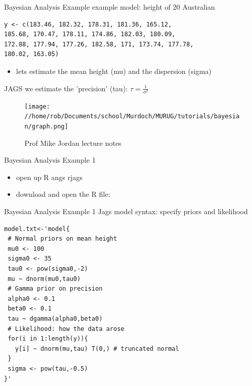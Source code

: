 \documentclass[presentation]{beamer}
\begin{document}
\begin{frame}[fragile,label=sec-26]{Bayesian Analysis Example}
 example model: height of 20 Australian

\color{blue}
\begin{verbatim}
y <- c(183.46, 182.32, 178.31, 181.36, 165.12, 
185.68, 170.47, 178.11, 174.86, 182.03, 180.09, 
172.88, 177.94, 177.26, 182.58, 171, 173.74, 177.78, 
180.02, 163.05)
\end{verbatim}

\color{black}
\begin{itemize}
\item lets estimate the mean height (mu) and the dispersion (sigma)
\end{itemize}
\begin{small}
JAGS we estimate the 'precision' (tau): $\tau=\frac{1}{\sigma^2}$
\end{small}
\begin{figure}[htb]
\centering
\texttt{[image: //home/rob/Documents/school/Murdoch/MURUG/tutorials/bayesian/graph.png]}
\caption{Prof Mike Jordan lecture notes}
\end{figure}
\end{frame}
\begin{frame}[label=sec-27]{Bayesian Analysis Example 1}
\begin{itemize}
\item open up R angs rjags
\item download and open the R file:
\end{itemize}
\end{frame}

\begin{frame}[fragile,label=sec-28]{Bayesian Analysis Example 1}
 Jags model syntax: specify priors and likelihood
\begin{verbatim}
model.txt<-'model{
 # Normal priors on mean height
 mu0 <- 100 
 sigma0 <- 35
 tau0 <- pow(sigma0,-2)
 mu ~ dnorm(mu0,tau0) 
 # Gamma prior on precision
 alpha0 <- 0.1
 beta0 <- 0.1
 tau ~ dgamma(alpha0,beta0)
 # Likelihood: how the data arose
 for(i in 1:length(y)){
   y[i] ~ dnorm(mu,tau) T(0,) # truncated normal
 }
 sigma <- pow(tau,-0.5)
}'
\end{verbatim}
\end{frame}
\end{document}
